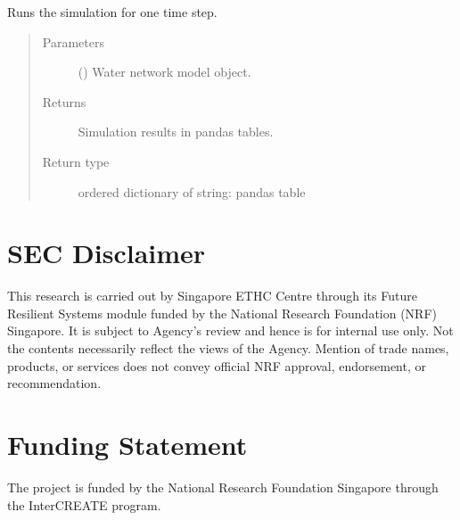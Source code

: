 \documentclass[letterpaper,10pt,english]{sphinxmanual}
\begin{document}
\begin{fulllineitems}
\label{\detokenize{apidoc:dreaminsg_integrated_model.src.network_sim_models.water.water_network_model.run_water_simulation}}
\sphinxAtStartPar
Runs the simulation for one time step.
\begin{quote}\begin{description}
\item[{Parameters}] \leavevmode
\sphinxAtStartPar
{} () \textendash{} Water network model object.

\item[{Returns}] \leavevmode
\sphinxAtStartPar
Simulation results in pandas tables.

\item[{Return type}] \leavevmode
\sphinxAtStartPar
ordered dictionary of string: pandas table

\end{description}\end{quote}

\end{fulllineitems}



\chapter{SEC Disclaimer}
\label{\detokenize{index:sec-disclaimer}}
\sphinxAtStartPar
This research is carried out by Singapore ETHC Centre through its Future Resilient Systems module
funded by the National Research Foundation (NRF) Singapore. It is subject to Agency’s review and hence is for internal use only.
Not the contents necessarily reflect the views of the Agency. Mention of trade names, products, or services does not convey official
NRF approval, endorsement, or recommendation.


\chapter{Funding Statement}
\label{\detokenize{index:funding-statement}}
\sphinxAtStartPar
The project is funded by the National Research Foundation Singapore through the Inter\sphinxhyphen{}CREATE program.
\end{document}

